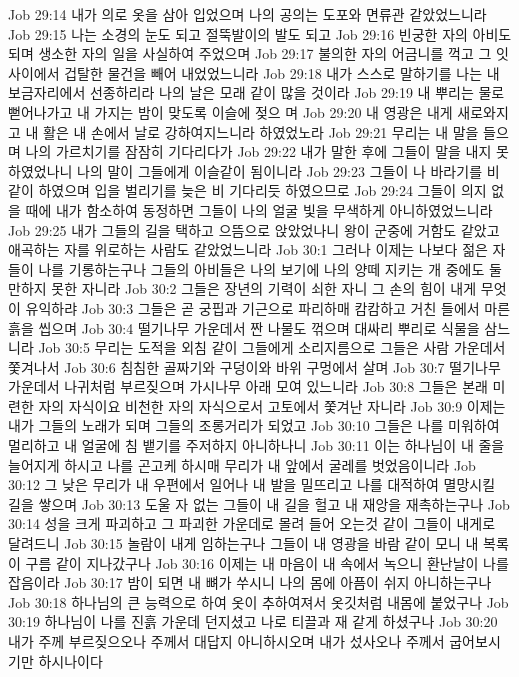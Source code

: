Job 29:14  내가 의로 옷을 삼아 입었으며 나의 공의는 도포와 면류관 같았었느니라
Job 29:15  나는 소경의 눈도 되고 절뚝발이의 발도 되고
Job 29:16  빈궁한 자의 아비도 되며 생소한 자의 일을 사실하여 주었으며
Job 29:17  불의한 자의 어금니를 꺽고 그 잇사이에서 겁탈한 물건을 빼어 내었었느니라
Job 29:18  내가 스스로 말하기를 나는 내 보금자리에서 선종하리라 나의 날은 모래 같이 많을 것이라
Job 29:19  내 뿌리는 물로 뻗어나가고 내 가지는 밤이 맞도록 이슬에 젖으 며
Job 29:20  내 영광은 내게 새로와지고 내 활은 내 손에서 날로 강하여지느니라 하였었노라
Job 29:21  무리는 내 말을 들으며 나의 가르치기를 잠잠히 기다리다가
Job 29:22  내가 말한 후에 그들이 말을 내지 못하였었나니 나의 말이 그들에게 이슬같이 됨이니라
Job 29:23  그들이 나 바라기를 비 같이 하였으며 입을 벌리기를 늦은 비 기다리듯 하였으므로
Job 29:24  그들이 의지 없을 때에 내가 함소하여 동정하면 그들이 나의 얼굴 빛을 무색하게 아니하였었느니라
Job 29:25  내가 그들의 길을 택하고 으뜸으로 앉았었나니 왕이 군중에 거함도 같았고 애곡하는 자를 위로하는 사람도 같았었느니라
Job 30:1  그러나 이제는 나보다 젊은 자들이 나를 기롱하는구나 그들의 아비들은 나의 보기에 나의 양떼 지키는 개 중에도 둘만하지 못한 자니라
Job 30:2  그들은 장년의 기력이 쇠한 자니 그 손의 힘이 내게 무엇이 유익하랴
Job 30:3  그들은 곧 궁핍과 기근으로 파리하매 캄캄하고 거친 들에서 마른 흙을 씹으며
Job 30:4  떨기나무 가운데서 짠 나물도 꺾으며 대싸리 뿌리로 식물을 삼느니라
Job 30:5  무리는 도적을 외침 같이 그들에게 소리지름으로 그들은 사람 가운데서 쫓겨나서
Job 30:6  침침한 골짜기와 구덩이와 바위 구멍에서 살며
Job 30:7  떨기나무 가운데서 나귀처럼 부르짖으며 가시나무 아래 모여 있느니라
Job 30:8  그들은 본래 미련한 자의 자식이요 비천한 자의 자식으로서 고토에서 쫓겨난 자니라
Job 30:9  이제는 내가 그들의 노래가 되며 그들의 조롱거리가 되었고
Job 30:10  그들은 나를 미워하여 멀리하고 내 얼굴에 침 뱉기를 주저하지 아니하나니
Job 30:11  이는 하나님이 내 줄을 늘어지게 하시고 나를 곤고케 하시매 무리가 내 앞에서 굴레를 벗었음이니라
Job 30:12  그 낮은 무리가 내 우편에서 일어나 내 발을 밀뜨리고 나를 대적하여 멸망시킬 길을 쌓으며
Job 30:13  도울 자 없는 그들이 내 길을 헐고 내 재앙을 재촉하는구나
Job 30:14  성을 크게 파괴하고 그 파괴한 가운데로 몰려 들어 오는것 같이 그들이 내게로 달려드니
Job 30:15  놀람이 내게 임하는구나 그들이 내 영광을 바람 같이 모니 내 복록이 구름 같이 지나갔구나
Job 30:16  이제는 내 마음이 내 속에서 녹으니 환난날이 나를 잡음이라
Job 30:17  밤이 되면 내 뼈가 쑤시니 나의 몸에 아픔이 쉬지 아니하는구나
Job 30:18  하나님의 큰 능력으로 하여 옷이 추하여져서 옷깃처럼 내몸에 붙었구나
Job 30:19  하나님이 나를 진흙 가운데 던지셨고 나로 티끌과 재 같게 하셨구나
Job 30:20  내가 주께 부르짖으오나 주께서 대답지 아니하시오며 내가 섰사오나 주께서 굽어보시기만 하시나이다
